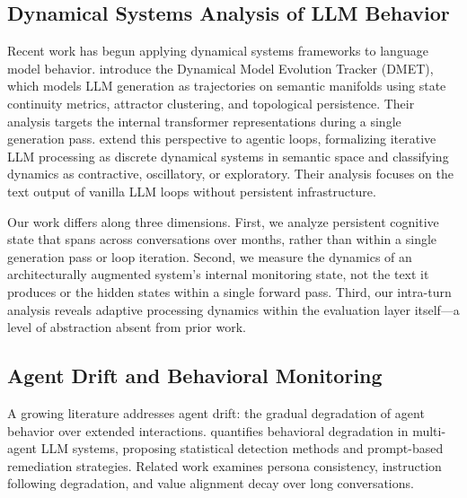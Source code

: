 \documentclass[twoside,11pt]{article}
\begin{document}
\subsection{Dynamical Systems Analysis of LLM Behavior}
\label{sec:related-dynamics}

Recent work has begun applying dynamical systems frameworks to language model
behavior. \citet{dmet2025} introduce the Dynamical Model Evolution Tracker
(DMET), which models LLM generation as trajectories on semantic manifolds using
state continuity metrics, attractor clustering, and topological persistence.
Their analysis targets the internal transformer representations during a single
generation pass. \citet{agenticloops2025} extend this perspective to agentic
loops, formalizing iterative LLM processing as discrete dynamical systems in
semantic space and classifying dynamics as contractive, oscillatory, or
exploratory. Their analysis focuses on the text output of vanilla LLM loops
without persistent infrastructure.

Our work differs along three dimensions. First, we analyze persistent cognitive
state that spans across conversations over months, rather than within a single
generation pass or loop iteration. Second, we measure the dynamics of an
architecturally augmented system's internal monitoring state, not the text it
produces or the hidden states within a single forward pass. Third, our
intra-turn analysis reveals adaptive processing dynamics within the evaluation
layer itself---a level of abstraction absent from prior work.

\subsection{Agent Drift and Behavioral Monitoring}
\label{sec:related-drift}

A growing literature addresses agent drift: the gradual degradation of agent
behavior over extended interactions. \citet{rath2026drift} quantifies
behavioral degradation in multi-agent LLM systems, proposing statistical
detection methods and prompt-based remediation strategies. Related work examines
persona consistency, instruction following degradation, and value alignment
decay over long conversations.
\end{document}

